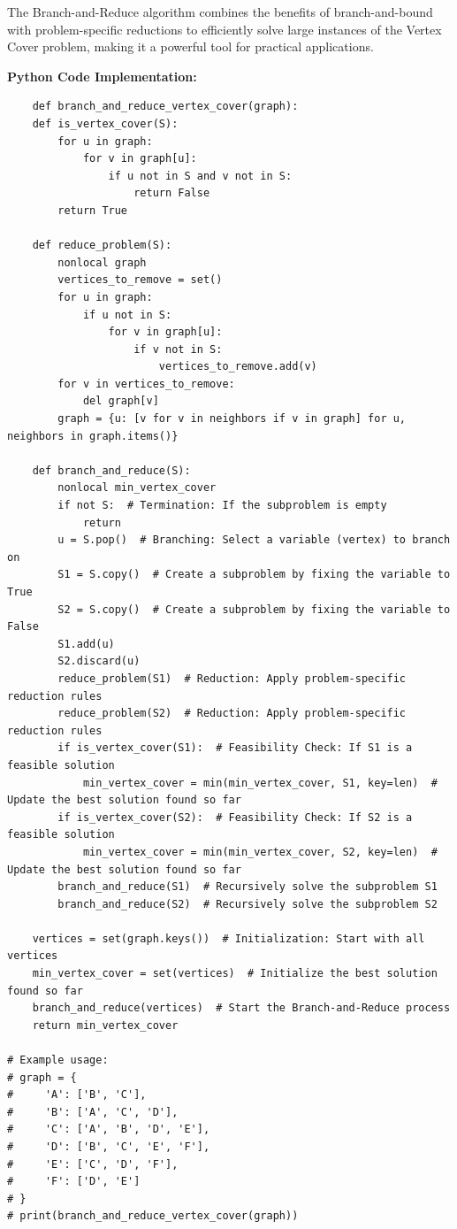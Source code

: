 \documentclass[12pt]{book} %
\begin{document}
The Branch-and-Reduce algorithm combines the benefits of branch-and-bound with problem-specific reductions to efficiently solve large instances of the Vertex Cover problem, making it a powerful tool for practical applications.

\textbf{Python Code Implementation:}
\FloatBarrier
\begin{lstlisting}
    def branch_and_reduce_vertex_cover(graph):
    def is_vertex_cover(S):
        for u in graph:
            for v in graph[u]:
                if u not in S and v not in S:
                    return False
        return True
    
    def reduce_problem(S):
        nonlocal graph
        vertices_to_remove = set()
        for u in graph:
            if u not in S:
                for v in graph[u]:
                    if v not in S:
                        vertices_to_remove.add(v)
        for v in vertices_to_remove:
            del graph[v]
        graph = {u: [v for v in neighbors if v in graph] for u, neighbors in graph.items()}
    
    def branch_and_reduce(S):
        nonlocal min_vertex_cover
        if not S:  # Termination: If the subproblem is empty
            return
        u = S.pop()  # Branching: Select a variable (vertex) to branch on
        S1 = S.copy()  # Create a subproblem by fixing the variable to True
        S2 = S.copy()  # Create a subproblem by fixing the variable to False
        S1.add(u)
        S2.discard(u)
        reduce_problem(S1)  # Reduction: Apply problem-specific reduction rules
        reduce_problem(S2)  # Reduction: Apply problem-specific reduction rules
        if is_vertex_cover(S1):  # Feasibility Check: If S1 is a feasible solution
            min_vertex_cover = min(min_vertex_cover, S1, key=len)  # Update the best solution found so far
        if is_vertex_cover(S2):  # Feasibility Check: If S2 is a feasible solution
            min_vertex_cover = min(min_vertex_cover, S2, key=len)  # Update the best solution found so far
        branch_and_reduce(S1)  # Recursively solve the subproblem S1
        branch_and_reduce(S2)  # Recursively solve the subproblem S2
    
    vertices = set(graph.keys())  # Initialization: Start with all vertices
    min_vertex_cover = set(vertices)  # Initialize the best solution found so far
    branch_and_reduce(vertices)  # Start the Branch-and-Reduce process
    return min_vertex_cover

# Example usage:
# graph = {
#     'A': ['B', 'C'],
#     'B': ['A', 'C', 'D'],
#     'C': ['A', 'B', 'D', 'E'],
#     'D': ['B', 'C', 'E', 'F'],
#     'E': ['C', 'D', 'F'],
#     'F': ['D', 'E']
# }
# print(branch_and_reduce_vertex_cover(graph))
\end{lstlisting}
\end{document}
